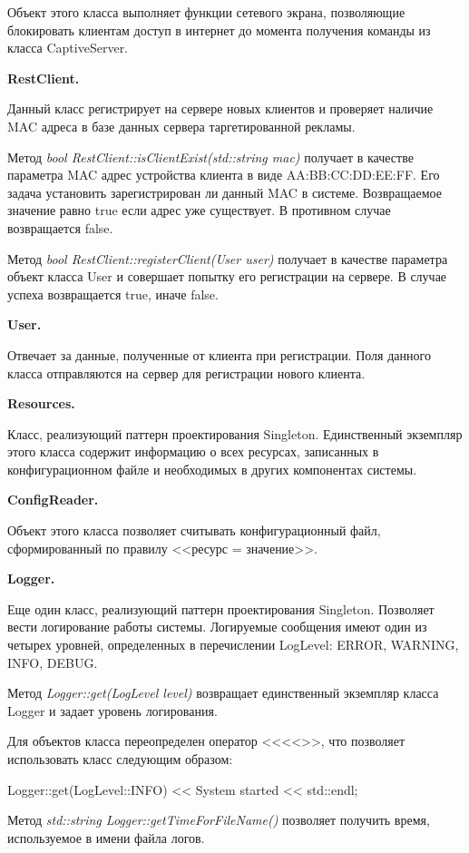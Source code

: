 Объект этого класса выполняет функции сетевого экрана, позволяющие блокировать клиентам доступ в интернет до момента получения команды из класса CaptiveServer.

\textbf{RestClient.}

Данный класс регистрирует на сервере новых клиентов и проверяет наличие MAC адреса в базе данных сервера таргетированной рекламы.

Метод \textit{bool RestClient::isClientExist(std::string mac)} получает в качестве параметра MAC адрес устройства клиента в виде AA:BB:CC:DD:EE:FF. Его задача установить зарегистрирован ли данный MAC в системе. Возвращаемое значение равно true если адрес уже существует. В противном случае возвращается false.

Метод \textit{bool RestClient::registerClient(User user)} получает в качестве параметра объект класса User и совершает попытку его регистрации на сервере. В случае успеха возвращается true, иначе false.

\textbf{User.}

Отвечает за данные, полученные от клиента при регистрации. Поля данного класса отправляются на сервер для регистрации нового клиента.

\textbf{Resources.}

Класс, реализующий паттерн проектирования Singleton. Единственный экземпляр этого класса содержит информацию о всех ресурсах, записанных в конфигурационном файле и необходимых в других компонентах системы.

\textbf{ConfigReader.}

Объект этого класса позволяет считывать конфигурационный файл, сформированный по правилу <<ресурс = значение>>.

\textbf{Logger.}

Еще один класс, реализующий паттерн проектирования Singleton. Позволяет вести логирование работы системы. Логируемые сообщения имеют один из четырех уровней, определенных в перечислении LogLevel: ERROR, WARNING, INFO, DEBUG.

Метод \textit{Logger::get(LogLevel level)} возвращает единственный экземпляр класса Logger и задает уровень логирования.

Для объектов класса переопределен оператор <<<<>>, что позволяет использовать класс следующим образом:

Logger::get(LogLevel::INFO) << System started << std::endl;

Метод \textit{std::string Logger::getTimeForFileName()} позволяет получить время, используемое в имени файла логов.

